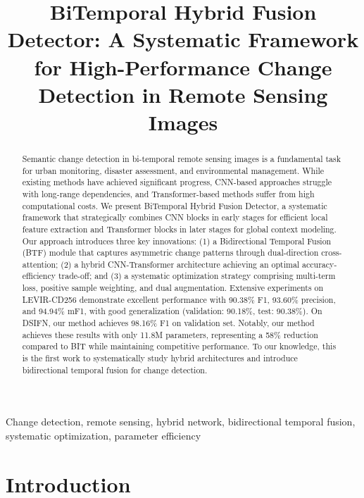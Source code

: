 \documentclass{IEEEtran}
\begin{document}
\title{BiTemporal Hybrid Fusion Detector: A Systematic Framework for High-Performance Change Detection in Remote Sensing Images}

\author{
}

\maketitle

\begin{abstract}
Semantic change detection in bi-temporal remote sensing images is a fundamental task for urban monitoring, disaster assessment, and environmental management. While existing methods have achieved significant progress, CNN-based approaches struggle with long-range dependencies, and Transformer-based methods suffer from high computational costs. We present BiTemporal Hybrid Fusion Detector, a systematic framework that strategically combines CNN blocks in early stages for efficient local feature extraction and Transformer blocks in later stages for global context modeling. Our approach introduces three key innovations: (1) a Bidirectional Temporal Fusion (BTF) module that captures asymmetric change patterns through dual-direction cross-attention; (2) a hybrid CNN-Transformer architecture achieving an optimal accuracy-efficiency trade-off; and (3) a systematic optimization strategy comprising multi-term loss, positive sample weighting, and dual augmentation. Extensive experiments on LEVIR-CD256 demonstrate excellent performance with 90.38\% F1, 93.60\% precision, and 94.94\% mF1, with good generalization (validation: 90.18\%, test: 90.38\%). On DSIFN, our method achieves 98.16\% F1 on validation set. Notably, our method achieves these results with only 11.8M parameters, representing a 58\% reduction compared to BIT while maintaining competitive performance. To our knowledge, this is the first work to systematically study hybrid architectures and introduce bidirectional temporal fusion for change detection.
\end{abstract}

\begin{IEEEkeywords}
Change detection, remote sensing, hybrid network, bidirectional temporal fusion, systematic optimization, parameter efficiency
\end{IEEEkeywords}

\section{Introduction}
\end{document}
